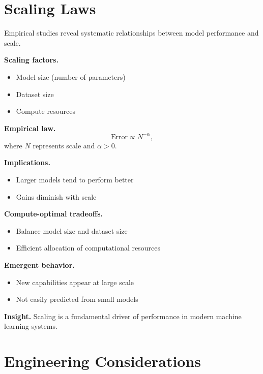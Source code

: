 \section{Scaling Laws}

Empirical studies reveal systematic relationships between model performance and scale.

\medskip

\noindent
\textbf{Scaling factors.}
\begin{itemize}
    \item Model size (number of parameters)
    \item Dataset size
    \item Compute resources
\end{itemize}

\medskip

\noindent
\textbf{Empirical law.}
\[
\text{Error} \propto N^{-\alpha},
\]
where $N$ represents scale and $\alpha > 0$.

\medskip

\noindent
\textbf{Implications.}
\begin{itemize}
    \item Larger models tend to perform better
    \item Gains diminish with scale
\end{itemize}

\medskip

\noindent
\textbf{Compute-optimal tradeoffs.}
\begin{itemize}
    \item Balance model size and dataset size
    \item Efficient allocation of computational resources
\end{itemize}

\medskip

\noindent
\textbf{Emergent behavior.}
\begin{itemize}
    \item New capabilities appear at large scale
    \item Not easily predicted from small models
\end{itemize}

\medskip

\noindent
\textbf{Insight.}  
Scaling is a fundamental driver of performance in modern machine learning systems.

\section{Engineering Considerations}

